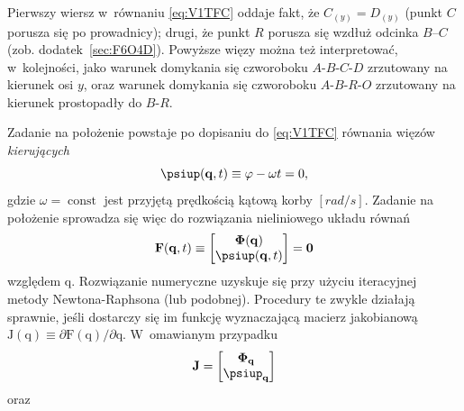 \documentclass[paper=a4,DIV=12]{tmmlab}
\newcommand{\brm}[1]{\bm{\mathrm{#1}}}
\begin{document}
\begin{appendices}
  Pierwszy wiersz w~równaniu \eqref{eq:V1TFC} oddaje fakt, że $C_{(y)} =
  D_{(y)}$ (punkt $C$ porusza się po prowadnicy); drugi, że punkt $R$ porusza
  się wzdłuż odcinka $B$--$C$ (zob. dodatek~\ref{sec:F6O4D}). Powyższe więzy
  można też interpretować, w~kolejności, jako warunek domykania się czworoboku
  $A$-$B$-$C$-$D$ zrzutowany na kierunek osi $y$, oraz warunek domykania się
  czworoboku $A$-$B$-$R$-$O$ zrzutowany na kierunek prostopadły do $B$-$R$.

  Zadanie na położenie powstaje po dopisaniu do \eqref{eq:V1TFC} równania
  więzów \emph{kierujących}
  \begin{equation}
    \psiup(\brm{q},t) \equiv \varphi - \omega t = 0,
    \label{eq:XA8OD}
  \end{equation}
  gdzie $\omega = \operatorname{const}$ jest przyjętą prędkością kątową korby
  $[rad/s]$. Zadanie na położenie sprowadza się więc do rozwiązania
  nieliniowego układu równań
  \begin{equation}
    \brm{F}(\brm{q},t) \equiv \begin{bmatrix}
      \brm{\Phi}(\brm{q}) \\
      \psiup(\brm{q},t)
    \end{bmatrix}
    = \brm{0}
    \label{eq:B5Y8F}
  \end{equation}
  względem $\brm{q}$. Rozwiązanie numeryczne uzyskuje się przy użyciu
  iteracyjnej metody Newtona-Raphsona (lub podobnej). Procedury te zwykle
  działają sprawnie, jeśli dostarczy się im funkcję wyznaczającą macierz
  jakobianową $\brm{J}(\brm{q}) \equiv \partial{\brm{F}(\brm{q})}/\partial{\brm{q}}$.
  W~omawianym przypadku
  \begin{equation}
    \brm{J} = \begin{bmatrix}
      \brm{\Phi}_{\brm{q}} \\
      \boldsymbol{\psiup}_{\brm{q}}
    \end{bmatrix}
    \label{eq:YJI5X}
  \end{equation}
  oraz

\end{appendices}
\end{document}
